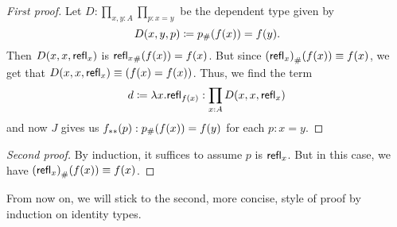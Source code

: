 \begin{proof}[First proof]
  Let $D:\prod_{x,y:A}\prod_{p:x=y}$ be the dependent type given by
  \begin{equation*}
    D(x,y,p)\coloneqq {p}_{\#}\!\left({f(x)}\right)= f(y).
  \end{equation*}
  Then $D(x,x,\mathsf{refl}_{x})$ is ${\mathsf{refl}_{x}}_{\#}\!\left({f(x)}\right)= f(x)$.
  But since ${(\mathsf{refl}_{x})}_{\#}\!\left({f(x)}\right)\equiv f(x)$, we get that $D(x,x,\mathsf{refl}_{x})\equiv (f(x)= f(x))$.
  Thus, we find the term
  \begin{equation*}
    d\coloneqq\lambda x.\mathsf{refl}_{f(x)}:\prod_{x:A} D(x,x,\mathsf{refl}_{x})
  \end{equation*}
  and now $J$ gives us ${f}_{**}\!\left({p}\right):{p}_{\#}\!\left({f(x)}\right)= f(y)$ for each $p:x= y$.
\end{proof}

\begin{proof}[Second proof]
  By induction, it suffices to assume $p$ is $\mathsf{refl}_{x}$.
  But in this case, we have ${(\mathsf{refl}_{x})}_{\#}\!\left({f(x)}\right)\equiv f(x)$.
\end{proof}

From now on, we will stick to the second, more concise, style of proof by induction on identity types.


